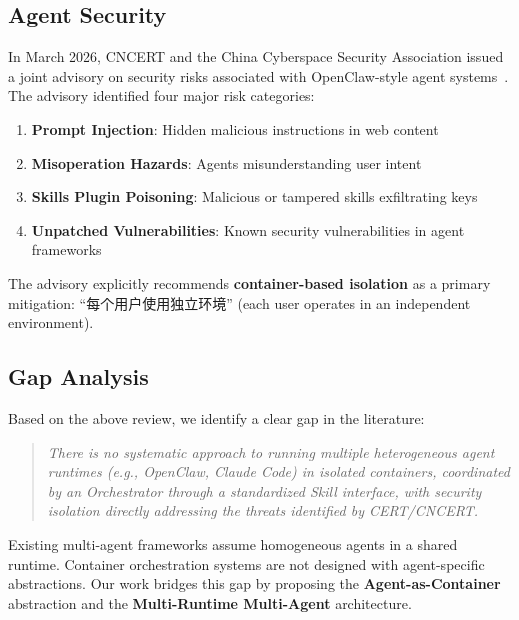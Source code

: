 \subsection{Agent Security}

In March 2026, CNCERT and the China Cyberspace Security Association issued a joint advisory on security risks associated with OpenClaw-style agent systems~\citep{cncert2026openclaw}. The advisory identified four major risk categories:

\begin{enumerate}
    \item \textbf{Prompt Injection}: Hidden malicious instructions in web content
    \item \textbf{Misoperation Hazards}: Agents misunderstanding user intent
    \item \textbf{Skills Plugin Poisoning}: Malicious or tampered skills exfiltrating keys
    \item \textbf{Unpatched Vulnerabilities}: Known security vulnerabilities in agent frameworks
\end{enumerate}

The advisory explicitly recommends \textbf{container-based isolation} as a primary mitigation: ``每个用户使用独立环境'' (each user operates in an independent environment).

\subsection{Gap Analysis}

Based on the above review, we identify a clear gap in the literature:

\begin{quote}
\textit{There is no systematic approach to running multiple heterogeneous agent runtimes (e.g., OpenClaw, Claude Code) in isolated containers, coordinated by an Orchestrator through a standardized Skill interface, with security isolation directly addressing the threats identified by CERT/CNCERT.}
\end{quote}

Existing multi-agent frameworks assume homogeneous agents in a shared runtime. Container orchestration systems are not designed with agent-specific abstractions. Our work bridges this gap by proposing the \textbf{Agent-as-Container} abstraction and the \textbf{Multi-Runtime Multi-Agent} architecture.
